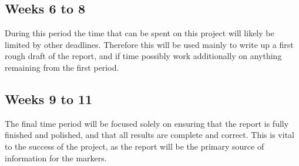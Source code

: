 \documentclass[bsc,frontabs,twoside,singlespacing,parskip,deptreport]{infthesis}     %
\begin{document}
\subsection{Weeks 6 to 8}
During this period the time that can be spent on this project will likely be limited by other deadlines. Therefore this will be used mainly to write up a first rough draft of the report, and if time possibly work additionally on anything remaining from the first period.
\subsection{Weeks 9 to 11}
The final time period will be focused solely on ensuring that the report is fully finished and polished, and that all results are complete and correct. This is vital to the success of the project, as the report will be the primary source of information for the markers.





\end{document}
